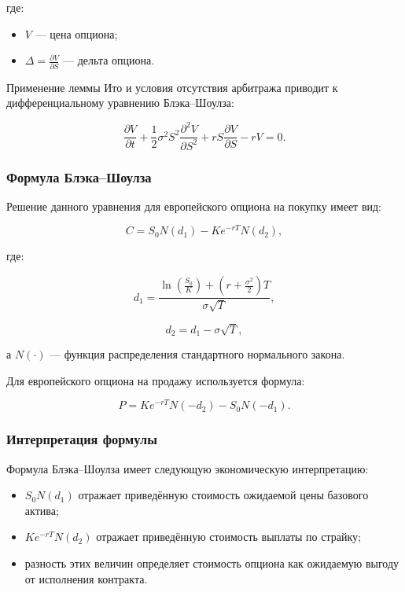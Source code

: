 \documentclass[11pt,a4paper]{article}
\begin{document}
где:
\begin{itemize}
    \item $V$ --- цена опциона;
    \item $\Delta = \frac{\partial V}{\partial S}$ --- дельта опциона.
\end{itemize}

Применение леммы Ито и условия отсутствия арбитража приводит к дифференциальному уравнению Блэка--Шоулза:

\begin{equation}
\frac{\partial V}{\partial t}
+
\frac{1}{2}\sigma^2 S^2 \frac{\partial^2 V}{\partial S^2}
+
rS \frac{\partial V}{\partial S}
-
rV
=
0.
\end{equation}

\subsubsection{Формула Блэка--Шоулза}

Решение данного уравнения для европейского опциона на покупку имеет вид:

\begin{equation}
C = S_0 N(d_1) - K e^{-rT} N(d_2),
\end{equation}

где:

\begin{equation}
d_1 =
\frac{
\ln\left(\frac{S_0}{K}\right)
+
\left(r + \frac{\sigma^2}{2}\right)T
}{
\sigma \sqrt{T}
},
\end{equation}

\begin{equation}
d_2 = d_1 - \sigma \sqrt{T},
\end{equation}

а $N(\cdot)$ --- функция распределения стандартного нормального закона.

Для европейского опциона на продажу используется формула:

\begin{equation}
P = K e^{-rT} N(-d_2) - S_0 N(-d_1).
\end{equation}

\subsubsection{Интерпретация формулы}

Формула Блэка--Шоулза имеет следующую экономическую интерпретацию:

\begin{itemize}
    \item $S_0 N(d_1)$ отражает приведённую стоимость ожидаемой цены базового актива;
    
    \item $K e^{-rT} N(d_2)$ отражает приведённую стоимость выплаты по страйку;
    
    \item разность этих величин определяет стоимость опциона как ожидаемую выгоду от исполнения контракта.
\end{itemize}
\end{document}

